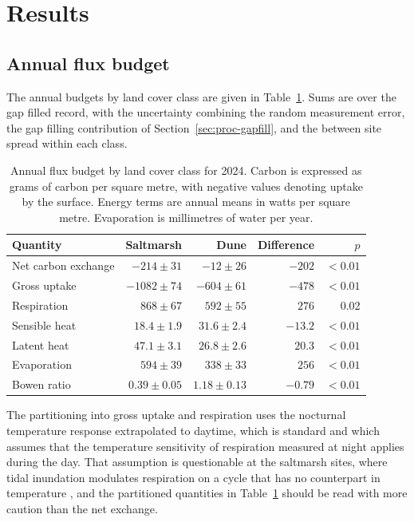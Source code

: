 \section{Results}
\label{sec:results}

\subsection{Annual flux budget}
\label{sec:results-budget}

The annual budgets by land cover class are given in
Table~\ref{tab:annual-budget}. Sums are over the gap filled record, with the
uncertainty combining the random measurement error, the gap filling
contribution of Section~\ref{sec:proc-gapfill}, and the between site spread
within each class.

\begin{table}[t]
\centering
\small
\caption{Annual flux budget by land cover class for 2024. Carbon is expressed as
grams of carbon per square metre, with negative values denoting uptake by the
surface. Energy terms are annual means in watts per square metre. Evaporation is
millimetres of water per year.}
\label{tab:annual-budget}
\begin{tabular}{lrrrr}
\toprule
Quantity & Saltmarsh & Dune & Difference & $p$ \\
\midrule
Net carbon exchange & $-214 \pm 31$ & $-12 \pm 26$ & $-202$ & $<0.01$ \\
Gross uptake        & $-1082 \pm 74$ & $-604 \pm 61$ & $-478$ & $<0.01$ \\
Respiration         & $868 \pm 67$ & $592 \pm 55$ & $276$ & 0.02 \\
Sensible heat       & $18.4 \pm 1.9$ & $31.6 \pm 2.4$ & $-13.2$ & $<0.01$ \\
Latent heat         & $47.1 \pm 3.1$ & $26.8 \pm 2.6$ & $20.3$ & $<0.01$ \\
Evaporation         & $594 \pm 39$ & $338 \pm 33$ & $256$ & $<0.01$ \\
Bowen ratio         & $0.39 \pm 0.05$ & $1.18 \pm 0.13$ & $-0.79$ & $<0.01$ \\
\bottomrule
\end{tabular}
\end{table}

The partitioning into gross uptake and respiration uses the nocturnal
temperature response extrapolated to daytime, which is standard and which
assumes that the temperature sensitivity of respiration measured at night
applies during the day. That assumption is questionable at the saltmarsh sites,
where tidal inundation modulates respiration on a cycle that has no counterpart
in temperature \citep{sandvik2023saltmarsh}, and the partitioned quantities in
Table~\ref{tab:annual-budget} should be read with more caution than the net
exchange.

